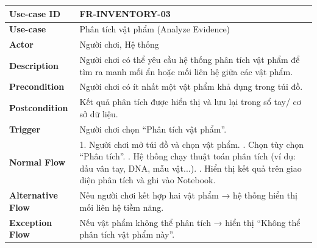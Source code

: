 \begin{table}[H]
\centering
\begin{tabular}{|p{4cm}|p{10cm}|}
\hline
\textbf{Use-case ID} & FR-INVENTORY-03 \\ \hline
\textbf{Use-case} & Phân tích vật phẩm (Analyze Evidence) \\ \hline
\textbf{Actor} & Người chơi, Hệ thống \\ \hline
\textbf{Description} & Người chơi có thể yêu cầu hệ thống phân tích vật phẩm để tìm ra manh mối ẩn hoặc mối liên hệ giữa các vật phẩm. \\ \hline
\textbf{Precondition} & Người chơi có ít nhất một vật phẩm khả dụng trong túi đồ. \\ \hline
\textbf{Postcondition} & Kết quả phân tích được hiển thị và lưu lại trong sổ tay/ cơ sở dữ liệu. \\ \hline
\textbf{Trigger} & Người chơi chọn “Phân tích vật phẩm”. \\ \hline
\textbf{Normal Flow} &
1. Người chơi mở túi đồ và chọn vật phẩm. \newline
2. Chọn tùy chọn “Phân tích”. \newline
3. Hệ thống chạy thuật toán phân tích (ví dụ: dấu vân tay, DNA, mẫu vật...). \newline
4. Hiển thị kết quả trên giao diện phân tích và ghi vào Notebook. \\ \hline
\textbf{Alternative Flow} &
Nếu người chơi kết hợp hai vật phẩm → hệ thống hiển thị mối liên hệ tiềm năng. \\ \hline
\textbf{Exception Flow} &
Nếu vật phẩm không thể phân tích → hiển thị “Không thể phân tích vật phẩm này”. \\ \hline
\end{tabular}
\end{table}


